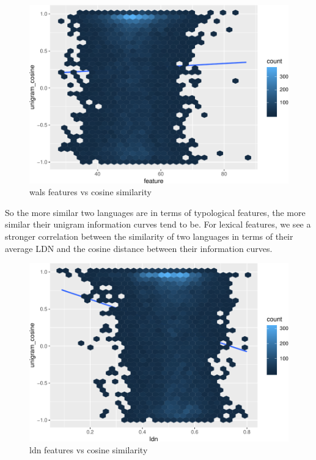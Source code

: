 \documentclass[11pt,]{article}
\begin{document}
\begin{figure}
\centering
\includegraphics{paper_files/figure-latex/unnamed-chunk-7-1.pdf}
\caption{\label{fig:unnamed-chunk-7}wals features vs cosine similarity}
\end{figure}

So the more similar two languages are in terms of typological features, the more similar their unigram information curves tend to be. For lexical features, we see a stronger correlation between the similarity of two languages in terms of their average LDN and the cosine distance between their information curves.

\begin{figure}
\centering
\includegraphics{paper_files/figure-latex/unnamed-chunk-8-1.pdf}
\caption{\label{fig:unnamed-chunk-8}ldn features vs cosine similarity}
\end{figure}
\end{document}
